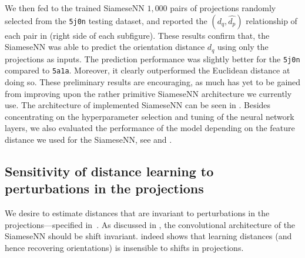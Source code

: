 We then fed to the trained SiameseNN $1,000$ pairs of projections randomly selected from the \texttt{5j0n} testing dataset, and reported the $(d_q,\widehat{d_p})$ relationship of each pair in  (right side of each subfigure).
These results confirm that, the SiameseNN was able to predict the orientation distance $d_q$ using only the projections as inputs.
The prediction performance was slightly better for the \texttt{5j0n} compared to \texttt{5a1a}.
Moreover, it clearly outperformed the Euclidean distance at doing so.
These preliminary results are encouraging, as much has yet to be gained from improving upon the rather primitive SiameseNN architecture we currently use.
The architecture of implemented SiameseNN can be seen in .
Besides concentrating on the hyperparameter selection and tuning of the neural network layers, we also evaluated the performance of the model depending on the feature distance we used for the SiameseNN, see  and .


\subsection{Sensitivity of distance learning to perturbations in the projections}\label{sec:results:distance-estimation:sensitivity}


We desire to estimate distances that are invariant to perturbations in the projections---specified in~.
As discussed in , the convolutional architecture of the SiameseNN should be shift invariant.
 indeed shows that learning distances (and hence recovering orientations) is insensible to shifts in projections.

